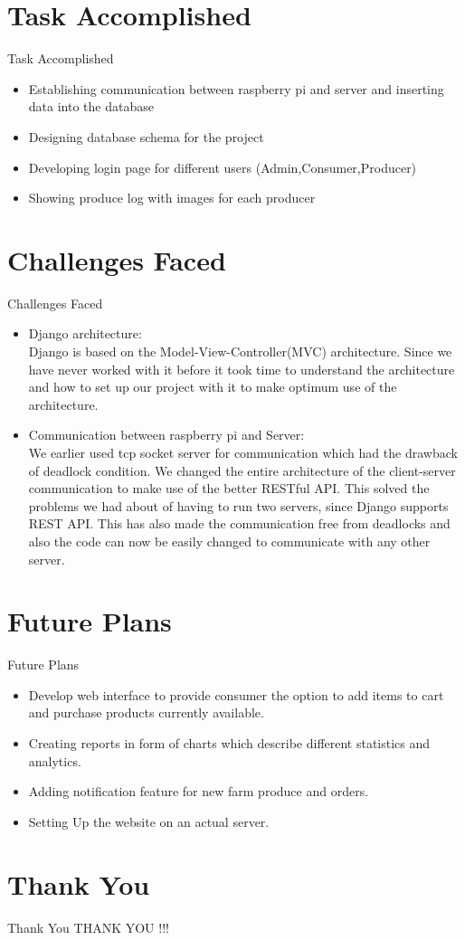 \documentclass[10pt, a4paper]{beamer}
\begin{document}
\section{Task Accomplished}
\begin{frame}{Task Accomplished}
    \begin{itemize}
        \item Establishing communication between raspberry pi and server and inserting data into the database
        \item Designing database schema for the project
        \item Developing login page for different users (Admin,Consumer,Producer)
        \item Showing produce log with images for each producer
    \end{itemize}
\end{frame}

\section{Challenges Faced}
\begin{frame}{Challenges Faced}
    \begin{itemize}
        \item Django architecture: \\Django is based on the Model-View-Controller(MVC) architecture. Since we have never worked with it before it took time to understand the architecture and how to set up our project with it to make optimum use of the architecture. 
        \item Communication between raspberry pi and Server:\\We earlier used tcp socket server for communication which had the drawback of deadlock condition. We changed the entire architecture of the client-server communication to make use of the better RESTful API. This solved the problems we had about of having to run two servers, since Django supports REST API. This has also made the communication free from deadlocks and also the code can now be easily changed to communicate with any other server.
    \end{itemize}
\end{frame}

\section{Future Plans}
\begin{frame}{Future Plans}
    \begin{itemize}
        \item Develop web interface to provide consumer the option to add items to cart and purchase products currently available.
        \item Creating reports in form of charts which describe different statistics and analytics.
        \item Adding notification feature for new farm produce and orders.
        \item Setting Up the website on an actual server.
    \end{itemize}
\end{frame}


\section{Thank You}
\begin{frame}{Thank You}
    \centering THANK YOU !!!
\end{frame}
\end{document}
